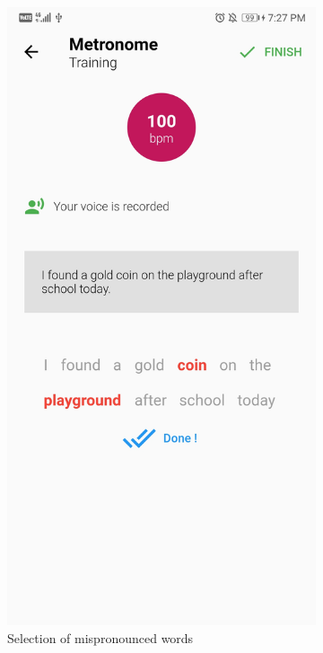 \begin{appendices}
\begin{landscape}
\begin{figure}[h]
  \begin{subfigure}{.25\textwidth}
    \centering
    \includegraphics[width=.75\linewidth]{content/imgs/screen5.jpg}
    \caption{Selection of mispronounced words}
  \end{subfigure}%
  \begin{subfigure}{.25\textwidth}
    \centering

\end{subfigure}
\end{figure}
\end{landscape}
\end{appendices}
